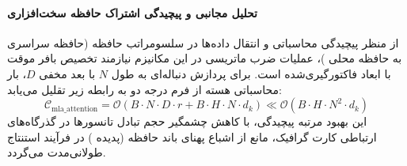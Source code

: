 \paragraph{تحلیل مجانبی و پیچیدگی اشتراک حافظه سخت‌افزاری}
از منظر پیچیدگی محاسباتی و انتقال داده‌ها در سلسومراتب حافظه (حافظه سراسری  به حافظه محلی )، عملیات ضرب ماتریسی در این مکانیزم نیازمند تخصیص بافر موقت با ابعاد فاکتورگیری‌شده است. برای پردازش دنباله‌ای به طول $N$ با بعد مخفی $D$، بار محاسباتی هسته از فرم درجه دو به رابطه زیر تقلیل می‌یابد:
\begin{equation}
\label{eq:complexity_mla_attention}
\mathcal{C}_{\text{mla\_attention}} = \mathcal{O}\left( B \cdot N \cdot D \cdot r + B \cdot H \cdot N \cdot d_k \right) \ll \mathcal{O}\left( B \cdot H \cdot N^2 \cdot d_k \right)
\end{equation}
این بهبود مرتبه پیچیدگی، با کاهش چشمگیر حجم تبادل تانسورها در گذرگاه‌های ارتباطی کارت گرافیک، مانع از اشباع پهنای باند حافظه (پدیده ) در فرآیند استنتاج طولانی‌مدت می‌گردد.